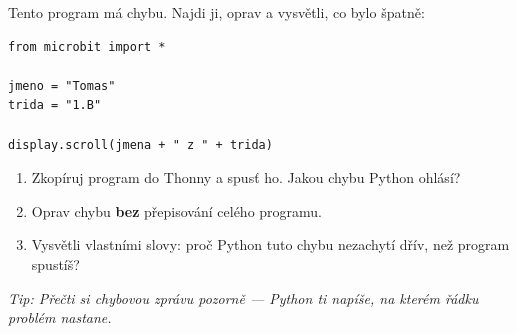 \begin{bonusukol}

Tento program má chybu. Najdi ji, oprav a vysvětli, co bylo špatně:

\begin{lstlisting}
from microbit import *

jmeno = "Tomas"
trida = "1.B"

display.scroll(jmena + " z " + trida)
\end{lstlisting}

\begin{enumerate}
  \item Zkopíruj program do Thonny a spusť ho. Jakou chybu Python ohlásí?
  \item Oprav chybu \textbf{bez} přepisování celého programu.
  \item Vysvětli vlastními slovy: proč Python tuto chybu nezachytí dřív,
        než program spustíš?
\end{enumerate}

\textit{Tip: Přečti si chybovou zprávu pozorně — Python ti napíše, na
kterém řádku problém nastane.}

\odpoved[2cm]

\end{bonusukol}


